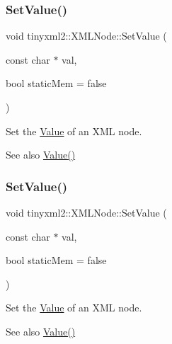 \subsubsection{\texorpdfstring{Set\+Value()}{SetValue()}\hspace{0.1cm}{\footnotesize\ttfamily [1/2]}}
{\footnotesize\ttfamily void tinyxml2\+::\+X\+M\+L\+Node\+::\+Set\+Value (\begin{DoxyParamCaption}\item[{const char $\ast$}]{val,  }\item[{bool}]{static\+Mem = {\ttfamily false} }\end{DoxyParamCaption})}

Set the \hyperlink{classValue}{Value} of an X\+ML node. \begin{DoxySeeAlso}{See also}
\hyperlink{classtinyxml2_1_1XMLNode_a66344989a4b436155bcda72bd6b07b82}{Value()} 
\end{DoxySeeAlso}
\mbox{\label{classtinyxml2_1_1XMLNode_a09dd68cf9eae137579f6e50f36487513}} 
\subsubsection{\texorpdfstring{Set\+Value()}{SetValue()}\hspace{0.1cm}{\footnotesize\ttfamily [2/2]}}
{\footnotesize\ttfamily void tinyxml2\+::\+X\+M\+L\+Node\+::\+Set\+Value (\begin{DoxyParamCaption}\item[{const char $\ast$}]{val,  }\item[{bool}]{static\+Mem = {\ttfamily false} }\end{DoxyParamCaption})}

Set the \hyperlink{classValue}{Value} of an X\+ML node. \begin{DoxySeeAlso}{See also}
\hyperlink{classtinyxml2_1_1XMLNode_a66344989a4b436155bcda72bd6b07b82}{Value()} 
\end{DoxySeeAlso}
\mbox{\label{classtinyxml2_1_1XMLNode_a8402cbd3129d20e9e6024bbcc0531283}} 
